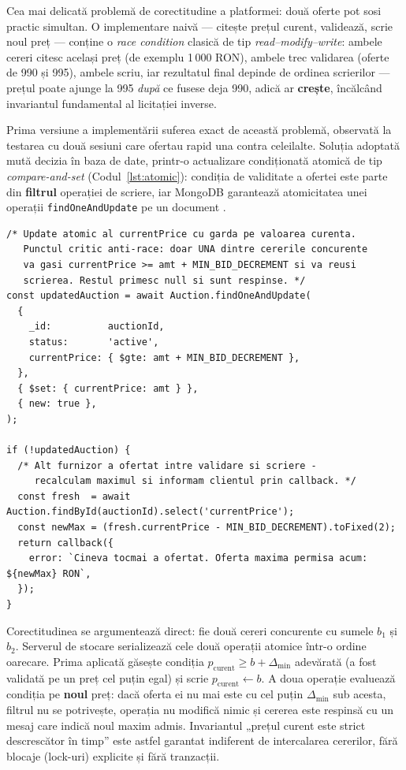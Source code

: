 Cea mai delicată problemă de corectitudine a platformei: două oferte pot sosi practic simultan. O implementare naivă --- citește prețul curent, validează, scrie noul preț --- conține o \textit{race condition} clasică de tip \textit{read--modify--write}: ambele cereri citesc același preț (de exemplu 1\,000 RON), ambele trec validarea (oferte de 990 și 995), ambele scriu, iar rezultatul final depinde de ordinea scrierilor --- prețul poate ajunge la 995 \textit{după} ce fusese deja 990, adică ar \textbf{crește}, încălcând invariantul fundamental al licitației inverse.

Prima versiune a implementării suferea exact de această problemă, observată la testarea cu două sesiuni care ofertau rapid una contra celeilalte. Soluția adoptată mută decizia în baza de date, printr-o actualizare condiționată atomică de tip \textit{compare-and-set} (Codul~\ref{lst:atomic}): condiția de validitate a ofertei este parte din \textbf{filtrul} operației de scriere, iar MongoDB garantează atomicitatea unei operații \texttt{findOneAndUpdate} pe un document \cite{mongodocs}.

\begin{lstlisting}[caption={Arbitrarea atomică a ofertelor concurente (server/sockets/bidSocket.js)},label={lst:atomic}]
/* Update atomic al currentPrice cu garda pe valoarea curenta.
   Punctul critic anti-race: doar UNA dintre cererile concurente
   va gasi currentPrice >= amt + MIN_BID_DECREMENT si va reusi
   scrierea. Restul primesc null si sunt respinse. */
const updatedAuction = await Auction.findOneAndUpdate(
  {
    _id:          auctionId,
    status:       'active',
    currentPrice: { $gte: amt + MIN_BID_DECREMENT },
  },
  { $set: { currentPrice: amt } },
  { new: true },
);

if (!updatedAuction) {
  /* Alt furnizor a ofertat intre validare si scriere -
     recalculam maximul si informam clientul prin callback. */
  const fresh  = await Auction.findById(auctionId).select('currentPrice');
  const newMax = (fresh.currentPrice - MIN_BID_DECREMENT).toFixed(2);
  return callback({
    error: `Cineva tocmai a ofertat. Oferta maxima permisa acum: ${newMax} RON`,
  });
}
\end{lstlisting}

Corectitudinea se argumentează direct: fie două cereri concurente cu sumele $b_1$ și $b_2$. Serverul de stocare serializează cele două operații atomice într-o ordine oarecare. Prima aplicată găsește condiția $p_{\text{curent}} \geq b + \Delta_{\min}$ adevărată (a fost validată pe un preț cel puțin egal) și scrie $p_{\text{curent}} \gets b$. A doua operație evaluează condiția pe \textbf{noul} preț: dacă oferta ei nu mai este cu cel puțin $\Delta_{\min}$ sub acesta, filtrul nu se potrivește, operația nu modifică nimic și cererea este respinsă cu un mesaj care indică noul maxim admis. Invariantul „prețul curent este strict descrescător în timp'' este astfel garantat indiferent de intercalarea cererilor, fără blocaje (lock-uri) explicite și fără tranzacții.

